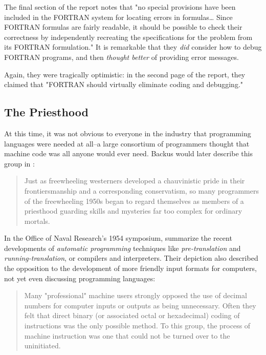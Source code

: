 The final section of the report notes that "no special provisions have been included
in the FORTRAN system for locating errors in formulas\dots
Since FORTRAN formulas are fairly readable, it should be possible to
check their correctness by independently recreating the specifications for
the problem from its FORTRAN formulation." \cite[C. DEBUGGING]{IBM_1954_FORTRAN_Specifications}
It is remarkable that they \textit{did} consider how to debug FORTRAN programs,
and then \textit{thought better} of providing error messages.

Again, they were tragically optimistic: in the second page of the report,
they claimed that "FORTRAN should virtually eliminate coding and debugging."

\subsection{The Priesthood}
\label{sec:backus_priesthood}

At this time, it was not obvious to everyone in the industry that
programming languages were needed at all--a large consortium of programmers
thought that machine code was all anyone would ever need.
Backus would later describe this group in :

\begin{quotation}
	Just as freewheeling westerners developed a chauvinistic pride in their frontiersmanship
	and a corresponding conservatism, so many programmers of the freewheeling 1950s
	began to regard themselves as members of a priesthood guarding skills and
	mysteries far too complex for ordinary mortals.
	\cite{Backus_1980_Programming_in_America_in_1950s}
\end{quotation}

In the Office of Naval Research's 1954 symposium,
\citeauthor{brown_carr_automatic_onr_symposium_1954} summarize the recent developments
of \textit{automatic programming} techniques like \textit{pre-translation} and \textit{running-translation},
or compilers and interpreters.
Their depiction also described the opposition to the development of more friendly
input formats for computers, not yet even discussing programming languages:

\begin{quotation}
	Many "professional" machine users strongly opposed the use of decimal
	numbers for computer inputs or outputs as being unnecessary. Often they felt
	that direct binary (or associated octal or hexadecimal) coding of instructions
	was the only possible method. To this group, the process of machine instruction
	was one that could not be turned over to the uninitiated.
	\cite{brown_carr_automatic_onr_symposium_1954}
\end{quotation}


